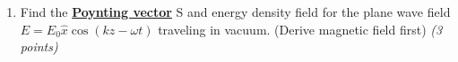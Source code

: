 \documentclass[main.tex]{subfiles}
\begin{document}
\begin{enumerate}

\item Find the \textbf{\underline{Poynting vector}} S and energy density field for the plane wave field $E = E_0\hat{x}\cos(kz-\omega t)$ traveling in vacuum. (Derive magnetic field first) \textit{(3 points)}\\

\end{enumerate}
\end{document}
